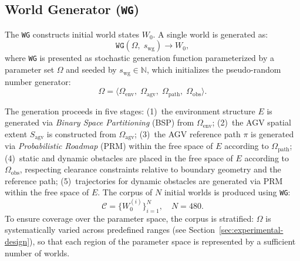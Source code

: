 \documentclass[conference]{IEEEtran}
\begin{document}
\subsection{World Generator (\texttt{WG})}
\label{sec:world-generator}
 
 
The \texttt{WG} constructs initial world states $W_0$.  A single world is generated as:
\begin{equation}
\label{eq:generation}
    \texttt{WG}(\Omega,\; s_{\text{wg}}) \to W_0,
\end{equation}
where \texttt{WG} is presented as stochastic generation function parameterized by a parameter set $\Omega$ and seeded by $s_{\text{wg}} \in \mathbb{N}$, which initializes the pseudo-random number generator:
\begin{equation}
\label{eq:omega}
    \Omega = \langle \Omega_{\text{env}},\; 
    \Omega_{\text{agv}},\;
    \Omega_{\text{path}}, \; 
    \Omega_{\text{obs}} \rangle.
\end{equation}
 
The generation proceeds in five stages: (1)~the environment structure $E$ is generated via \emph{Binary Space Partitioning} (BSP) from $\Omega_{\text{env}}$; (2)~the AGV spatial extent $S_{\text{agv}}$ is constructed from $\Omega_{\text{agv}}$; (3)~the AGV reference path $\pi$ is generated via \emph{Probabilistic Roadmap} (PRM) within the free space of $E$ according to $\Omega_{\text{path}}$; (4)~static and dynamic obstacles are placed in the free space of $E$ according to $\Omega_{\text{obs}}$, respecting clearance constraints relative to boundary geometry and the reference path; (5)~trajectories for dynamic obstacles are generated via PRM within the free space of $E$.
The corpus of $N$ initial worlds is produced using \texttt{WG}:
\begin{equation}
\label{eq:corpus}
    \mathcal{C} = \{W_0^{(i)}\}_{i=1}^{N}, \quad N = 480.
\end{equation}
To ensure coverage over the parameter space, the corpus is stratified: $\Omega$ is systematically varied across predefined ranges (see Section~\ref{sec:experimental-design}), so that each region of the parameter space is represented by a sufficient number of worlds.
 
 
\end{document}
